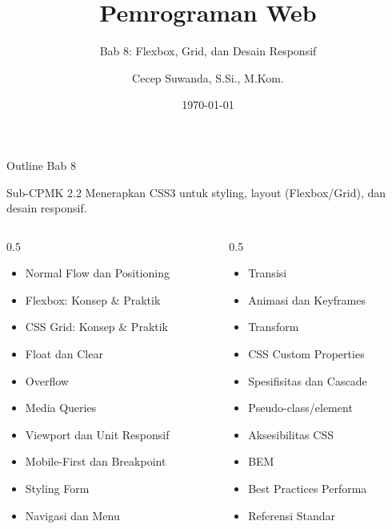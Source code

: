 \documentclass[handout]{beamer}
\title[Bab 8 -- Flexbox Grid]{Pemrograman Web}
\subtitle{Bab 8: Flexbox, Grid, dan Desain Responsif}
\author{Cecep Suwanda, S.Si., M.Kom.}
\institute{Universitas Bale Bandung}
\date{\today}
\begin{document}
\begin{frame}
	\titlepage
\end{frame}

\begin{frame}[shrink=15]{Outline Bab 8}
	\begin{block}{Sub-CPMK 2.2}
		Menerapkan CSS3 untuk styling, layout (Flexbox/Grid), dan desain responsif.
	\end{block}
	\begin{columns}[T]
		\begin{column}{0.5\textwidth}
			\begin{itemize}
				\item Normal Flow dan Positioning
				\item Flexbox: Konsep \& Praktik
				\item CSS Grid: Konsep \& Praktik
				\item Float dan Clear
				\item Overflow
				\item Media Queries
				\item Viewport dan Unit Responsif
				\item Mobile-First dan Breakpoint
				\item Styling Form
				\item Navigasi dan Menu
			\end{itemize}
		\end{column}
		\begin{column}{0.5\textwidth}
			\begin{itemize}
				\item Transisi
				\item Animasi dan Keyframes
				\item Transform
				\item CSS Custom Properties
				\item Spesifisitas dan Cascade
				\item Pseudo-class/element
				\item Aksesibilitas CSS
				\item BEM
				\item Best Practices Performa
				\item Referensi Standar
			\end{itemize}
		\end{column}
	\end{columns}
\end{frame}
\end{document}
